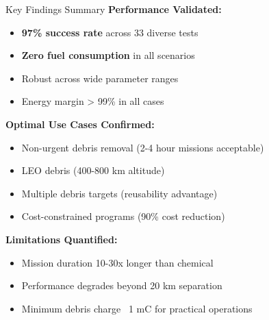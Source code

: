 \documentclass[aspectratio=169]{beamer}
\begin{document}
\begin{frame}{Key Findings Summary}
\textbf{Performance Validated:}
\begin{itemize}
    \item[\checkmark] \textbf{97\% success rate} across 33 diverse tests
    \item[\checkmark] \textbf{Zero fuel consumption} in all scenarios
    \item[\checkmark] Robust across wide parameter ranges
    \item[\checkmark] Energy margin > 99\% in all cases
\end{itemize}

\vspace{1em}
\textbf{Optimal Use Cases Confirmed:}
\begin{itemize}
    \item Non-urgent debris removal (2-4 hour missions acceptable)
    \item LEO debris (400-800 km altitude)
    \item Multiple debris targets (reusability advantage)
    \item Cost-constrained programs (90\% cost reduction)
\end{itemize}

\vspace{1em}
\textbf{Limitations Quantified:}
\begin{itemize}
    \item Mission duration 10-30x longer than chemical
    \item Performance degrades beyond 20 km separation
    \item Minimum debris charge ~1 mC for practical operations
\end{itemize}
\end{frame}
\end{document}
